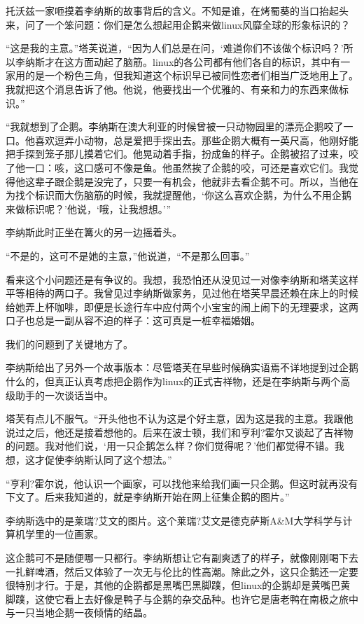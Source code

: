 托沃兹一家咂摸着李纳斯的故事背后的含义。不知是谁，在烤蜀葵的当口抬起头来，问了一个笨问题：你们是怎么想起用企鹅来做linux风靡全球的形象标识的？

“这是我的主意。”塔芙说道，“因为人们总是在问，‘难道你们不该做个标识吗？’所以李纳斯才在这方面动起了脑筋。linux的各公司都有他们各自的标识，其中有一家用的是一个粉色三角，但我知道这个标识早已被同性恋者们相当广泛地用上了。我就把这个消息告诉了他。他说，他要找出一个优雅的、有亲和力的东西来做标识。”

“我就想到了企鹅。李纳斯在澳大利亚的时候曾被一只动物园里的漂亮企鹅咬了一口。他喜欢逗弄小动物，总是爱把手探出去。那些企鹅大概有一英尺高，他刚好能把手探到笼子那儿摸着它们。他晃动着手指，扮成鱼的样子。企鹅被招了过来，咬了他一口：咳，这口感可不像是鱼。他虽然挨了企鹅的咬，可还是喜欢它们。我觉得他这辈子跟企鹅是没完了，只要一有机会，他就非去看企鹅不可。所以，当他在为找个标识而大伤脑筋的时候，我就提醒他，‘你这么喜欢企鹅，为什么不用企鹅来做标识呢？’他说，‘哦，让我想想。’”

李纳斯此时正坐在篝火的另一边摇着头。

“不是的，这可不是她的主意，”他说道，“不是那么回事。”

看来这个小问题还是有争议的。我想，我恐怕还从没见过一对像李纳斯和塔芙这样平等相待的两口子。我曾见过李纳斯做家务，见过他在塔芙早晨还赖在床上的时候给她弄上杯咖啡，即便是长途行车中应付两个小宝宝的闹上闹下的无理要求，这两口子也总是一副从容不迫的样子：这可真是一桩幸福婚姻。

我们的问题到了关键地方了。

李纳斯给出了另外一个故事版本：尽管塔芙在早些时候确实语焉不详地提到过企鹅什么的，但真正认真考虑把企鹅作为linux的正式吉祥物，还是在李纳斯与两个高级助手的一次谈话当中。

塔芙有点儿不服气。“开头他也不认为这是个好主意，因为这是我的主意。我跟他说过之后，他还是接着想他的。后来在波士顿，我们和亨利?霍尔又谈起了吉祥物的问题。我对他们说，‘用一只企鹅怎么样？你们觉得呢？’他们都觉得不错。我想，这才促使李纳斯认同了这个想法。”

“亨利?霍尔说，他认识一个画家，可以找他来给我们画一只企鹅。但这时就再没有下文了。后来我知道的，就是李纳斯开始在网上征集企鹅的图片。”

李纳斯选中的是莱瑞?艾文的图片。这个莱瑞?艾文是德克萨斯A\&M大学科学与计算机学里的一位画家。

这企鹅可不是随便哪一只都行。李纳斯想让它有副爽透了的样子，就像刚刚喝下去一扎鲜啤酒，然后又体验了一次无与伦比的性高潮。除此之外，这只企鹅还一定要很特别才行。于是，其他的企鹅都是黑嘴巴黑脚蹼，但linux的企鹅却是黄嘴巴黄脚蹼，这使它看上去好像是鸭子与企鹅的杂交品种。也许它是唐老鸭在南极之旅中与一只当地企鹅一夜倾情的结晶。

